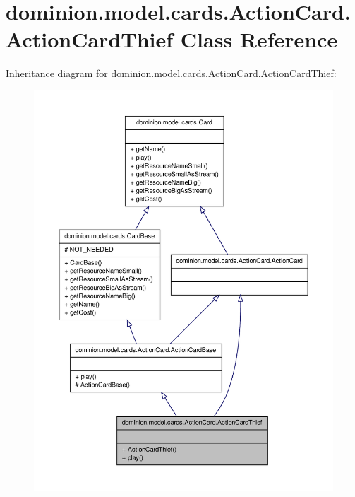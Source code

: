 \hypertarget{classdominion_1_1model_1_1cards_1_1ActionCard_1_1ActionCardThief}{\section{dominion.\-model.\-cards.\-Action\-Card.\-Action\-Card\-Thief \-Class \-Reference}
\label{classdominion_1_1model_1_1cards_1_1ActionCard_1_1ActionCardThief}
}


\-Inheritance diagram for dominion.\-model.\-cards.\-Action\-Card.\-Action\-Card\-Thief\-:
\nopagebreak
\begin{figure}[H]
\begin{center}
\leavevmode
\includegraphics[width=350pt]{classdominion_1_1model_1_1cards_1_1ActionCard_1_1ActionCardThief__inherit__graph}
\end{center}
\end{figure}


